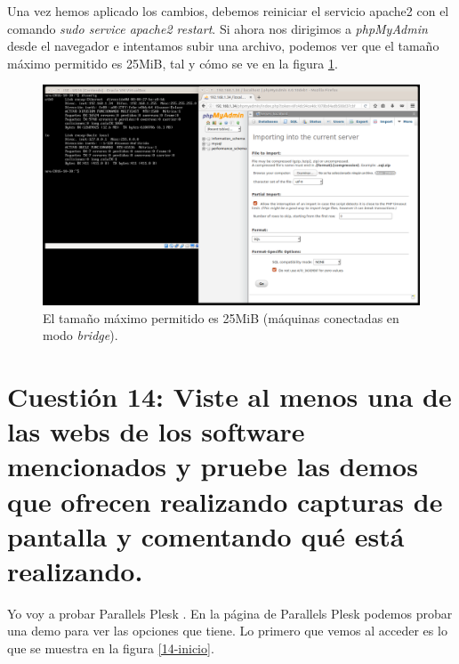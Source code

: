 \documentclass[a4paper,titlepage,12pt]{scrartcl}	%
\numberwithin{figure}{section} %
\numberwithin{table}{section} %
\begin{document}
	Una vez hemos aplicado los cambios, debemos reiniciar el servicio apache2 con el comando \textit{sudo service apache2 restart}. Si ahora nos dirigimos a \textit{phpMyAdmin} desde el navegador e intentamos subir una archivo, podemos ver que el tamaño máximo permitido es 25MiB, tal y cómo se ve en la figura \ref{13-tamanio25}.
	
	\begin{figure}[H]
		\includegraphics[width=\linewidth]{./Imagenes/13-tamanio25.png}
		\vspace{-0.5cm}
		\caption[El tamaño máximo permitido es 25MiB (máquinas conectadas en modo \textit{bridge}).]{El tamaño máximo permitido es 25MiB (máquinas conectadas en modo \textit{bridge}).}
		\label{13-tamanio25}
	\end{figure}
	
	\section[Cuestión 14: Viste al menos una de las webs de los software mencionados y pruebe las demos que ofrecen realizando capturas de pantalla y comentando qué está realizando.]{Cuestión 14: Viste al menos una de las webs de los software mencionados y pruebe las demos que ofrecen realizando capturas de pantalla y comentando qué está realizando.}
	
	Yo voy a probar Parallels Plesk \cite{parallelplesk}. En la página de Parallels Plesk podemos probar una demo para ver las opciones que tiene. Lo primero que vemos al acceder es lo que se muestra en la figura \ref{14-inicio}.
	
\end{document}
